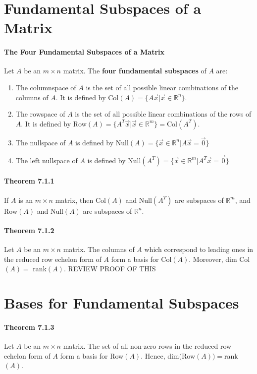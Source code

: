\documentclass[10pt,letter]{article}
\begin{document}
\section*{Fundamental Subspaces of a Matrix}

\paragraph{The Four Fundamental Subspaces of a Matrix}
Let $A$ be an $m\times n$ matrix. The \textbf{four fundamental subspaces} of $A$ are: 
\begin{enumerate}
    \item The columnspace of $A$ is the set of all possible linear combinations of the columns of $A$. It is defined by Col$(A) = \{A\vec{x} | \vec{x}\in\mathbb{R}^n\}$. 
    \item The rowspace of $A$ is the set of all possible linear combinations of the rows of $A$. It is defined by Row$(A) = \{A^T\vec{x} | \vec{x}\in\mathbb{R}^m\}=\text{Col}(A^T)$. 
    \item The nullspace of $A$ is defined by  Null$(A)=\{\vec{x}\in\mathbb{R}^n|A\vec{x}=\vec{0}\}$ 
    \item The left nullspace of $A$ is defined by Null$(A^T)=\{\vec{x}\in\mathbb{R}^m|A^T\vec{x}=\vec{0}\}$
\end{enumerate}

\paragraph{Theorem 7.1.1} If $A$ is an $m\times n$ matrix, then Col$(A)$ and Null$(A^T)$ are subspaces of $\mathbb{R}^m$, and Row$(A)$ and Null$(A)$ are subspaces of $\mathbb{R}^n$. 

\paragraph{Theorem 7.1.2} Let $A$ be an $m\times n$ matrix. The columns of $A$ which correspond to leading ones in the reduced row echelon form of $A$ form a basis for Col$(A)$. Moreover, dim Col$(A) =$ rank$(A)$. REVIEW PROOF OF THIS

\section*{Bases for Fundamental Subspaces}

\paragraph{Theorem 7.1.3} Let $A$ be an $m\times n$ matrix. The set of all non-zero rows in the reduced row echelon form of $A$ form a basis for Row$(A)$. Hence, dim$($Row$(A)) = $rank$(A)$.
\end{document}
